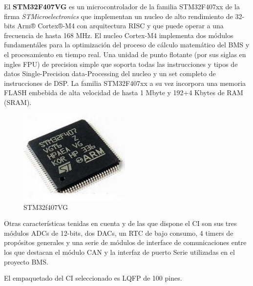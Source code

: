 \documentclass[10pt, a4paper]{article}
\begin{document}
El \textbf{STM32F407VG} es un microcontrolador de la familia STM32F407xx de la
firma \emph{STMicroelectronics} que implementan un nucleo de alto rendimiento de
32-bits Arm® Cortex®-M4 con arquitectura \acrshort{RISC} y que puede operar a
una frecuencia de hasta 168 MHz. El nucleo Cortex-M4 implementa dos módulos
fundamentáles para la optimización del proceso de cálculo matemático del
\acrshort{BMS} y el procesamiento en tiempo real. Una unidad de punto flotante
(por sus siglas en ingles \acrfull{FPU}) de precision simple que soporta todas
las instrucciones y tipos de datos Single-Precision data-Processing del nucleo
y un set completo de instrucciones de \acrshort{DSP}. La familia STM32F407xx a
su vez incorpora una memoria FLASH embebida de alta velocidad de hasta 1 Mbyte y
192+4 Kbytes de RAM (\acrfull{SRAM}).

\begin{figure}
    \includegraphics[width=5.5cm]{STM32F407VG.png}
    \caption{STM32f407VG}
    \label{fig:stm32f407vg}                                                            
\end{figure}                                                                 

Otras características tenidas en cuenta y de las que dispone el \acrshort{CI}
son sus tres módulos ADCs de 12-bits, dos DACs, un \acrshort{RTC} de
bajo consumo, 4 timers de propósitos generales y una serie de módulos de
interface de comunicaciones entre los que destacan el módulo \acrshort{CAN} y la
interfaz de puerto Serie utilizadas en el proyecto \acrshort{BMS}.

El empaquetado del \acrshort{CI} seleccionado es \acrfull{LQFP} de 100 pines.
\end{document}
